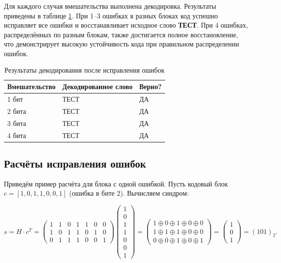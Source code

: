Для каждого случая вмешательства выполнена декодировка. Результаты приведены в таблице \ref{tab:decode}. При 1--3 ошибках в разных блоках код успешно исправляет все ошибки и восстанавливает исходное слово \textbf{ТЕСТ}. При 4 ошибках, распределённых по разным блокам, также достигается полное восстановление, что демонстрирует высокую устойчивость кода при правильном распределении ошибок.

\begin{table}[H]
    \centering
    \caption{Результаты декодирования после исправления ошибок}
    \label{tab:decode}
    \begin{tabular}{|l|l|l|}
        \toprule
        Вмешательство & Декодированное слово & Верно? \\
        \midrule
        1 бит & ТЕСТ & ДА \\
        2 бита & ТЕСТ & ДА \\
        3 бита & ТЕСТ & ДА \\
        4 бита & ТЕСТ & ДА \\
        \bottomrule
    \end{tabular}
\end{table}

\subsection{Расчёты исправления ошибок}
Приведём пример расчёта для блока с одной ошибкой. Пусть кодовый блок $c = [1, 0, 1, 1, 0, 0, 1]$ (ошибка в бите 2). Вычисляем синдром:

\[
s = H \cdot c^T = \begin{pmatrix}
1 & 1 & 0 & 1 & 1 & 0 & 0 \\
1 & 0 & 1 & 1 & 0 & 1 & 0 \\
0 & 1 & 1 & 1 & 0 & 0 & 1
\end{pmatrix}
\begin{pmatrix}
1 \\ 0 \\ 1 \\ 1 \\ 0 \\ 0 \\ 1
\end{pmatrix}
= \begin{pmatrix}
1 \oplus 0 \oplus 1 \oplus 0 \oplus 0 \\ 1 \oplus 1 \oplus 1 \oplus 0 \oplus 0 \\ 0 \oplus 0 \oplus 1 \oplus 0 \oplus 1
\end{pmatrix}
= \begin{pmatrix}
1 \\ 0 \\ 1
\end{pmatrix} = (101)_2.
\]

